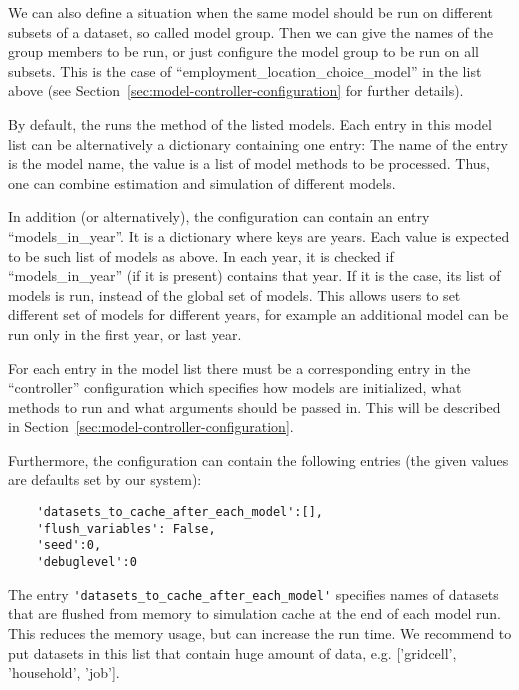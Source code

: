 We can also define a situation when the same model should be run on different subsets of 
a dataset, so called model group. Then we can give the names of the group members to be run, or 
just configure the model group to be run on all subsets. This is the case of ``employment_location_choice_model''
in the list above (see Section~\ref{sec:model-controller-configuration} for further details).
 
By default, the  runs the method
 of the listed models. \modelsindex Each entry in this model list can be
alternatively a dictionary containing one entry: The name of the entry is the model
name, the value is a list of model methods to be processed. Thus, one can combine
estimation and simulation of different models. \modelsindex

In addition (or alternatively), the configuration can contain an entry
``models_in_year''. \modelsindex It is a dictionary where keys are years. Each value is
expected to be such list of models \modelsindex as above. In each year, it is checked if
``models_in_year'' \modelsindex (if it is present) contains that year. If it is the case,
its list of models \modelsindex is run, instead of the global set of models. \modelsindex This allows
users to set different set of models \modelsindex for different years, for example an
additional model can be run only in the first year, or last year.

For each entry in the model \modelsindex list there must be a corresponding entry in
the ``controller'' configuration which specifies how models \modelsindex are initialized,
what methods to run and what arguments should be passed in. This will be
described in Section~\ref{sec:model-controller-configuration}.

Furthermore, the configuration can contain the following entries (the given
values are defaults set by our system):
\begin{verbatim}
    'datasets_to_cache_after_each_model':[],
    'flush_variables': False,
    'seed':0,
    'debuglevel':0
\end{verbatim}

The entry \verb|'datasets_to_cache_after_each_model'| specifies names of datasets \datasetindex that
are flushed from memory to simulation cache \simulationcacheindex at the end of each model
run.  This reduces the memory
usage, but can increase the run time. We recommend to put datasets in this list
that contain huge amount of data, e.g.  ['gridcell', 'household', 'job'].

